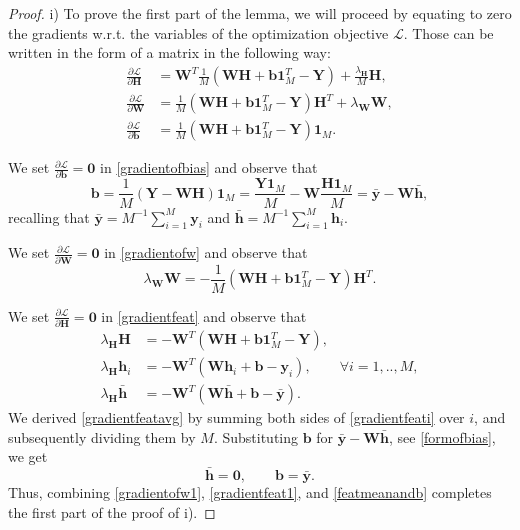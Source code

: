 \documentclass{article}
\theoremstyle{plain}
\theoremstyle{definition}
\theoremstyle{remark}
\newcommand{\bW}{{\mathbf W}}
\newcommand{\bY}{{\mathbf Y}}
\newcommand{\bH}{{\mathbf H}}
\newcommand{\bh}{{\mathbf h}}
\newcommand{\by}{{\mathbf y}}
\newcommand{\byb}{{\bar{\mathbf y}}}
\newcommand{\bb}{{\mathbf b}}
\newcommand{\lH}{\lambda_{\bH}}
\newcommand{\lW}{\lambda_{\bW}}
\begin{document}
\begin{proof}
i) 
To prove the first part of the lemma, we will proceed by equating to zero the gradients w.r.t. the variables of the optimization objective $\mathcal{L}$.
Those can be written in the form of a matrix in the following way:
\begin{align}
\frac{\partial \mathcal{L}}{\partial \bH}&=
\bW^{T} \frac{1}{M} (\bW \bH+\bb \mathbf{1}_M^{T}-\bY)+\frac{\lH}{M} \bH, \label{gradientfeat}
\\
\frac{\partial \mathcal{L}}{\partial \bW}&=
\frac{1}{M} (\bW \bH+\bb \mathbf{1}_M^{T}-\bY) \bH^{T}+\lW \bW, \label{gradientofw}
\\
\frac{\partial \mathcal{L}}{\partial \bb} &= \frac{1}{M}(\bW \bH + \bb \mathbf{1}_M^T -\bY) \mathbf{1}_M. 
\label{gradientofbias}
\end{align}

We set $\frac{\partial \mathcal{L}}{\partial \bb}=\mathbf{0}$ in \eqref{gradientofbias} and observe that 
\begin{equation} \label{formofbias}
\bb = \frac{1}{M} (\bY-\bW \bH) \mathbf{1}_M=
\frac{\bY \mathbf{1}_M}{M}-\bW \frac{\bH \mathbf{1}_M}{M}=\byb - \bW \bar{\bh}, 
\end{equation}
recalling that $\byb=M^{-1} \sum_{i=1}^M \by_i$ and $\bar{\bh}=M^{-1} \sum_{i=1}^M \bh_i$.

We set $\frac{\partial \mathcal{L}}{\partial \bW}=\mathbf{0}$ in \eqref{gradientofw} and observe that
\begin{equation} \label{gradientofw1}
    \lW \bW = -\frac{1}{M} (\bW\bH+\bb \mathbf{1}_M^T-\bY) \bH^{T}.
\end{equation}

We set $\frac{\partial \mathcal{L}}{\partial \bH}=\mathbf{0}$ in \eqref{gradientfeat} and observe that
\begin{align} \label{gradientfeat1}
\lH \bH &= - \bW^{T} (\bW \bH+\bb \mathbf{1}_M^{T}-\bY), 
\\
\lH \bh_i&=-\bW^{T} (\bW \bh_i+\bb-\by_i), \qquad \forall i=1,..,M, \label{gradientfeati}
\\
\lH \bar{\bh}&=-\bW^{T}(\bW \bar{\bh}+\bb-\byb). \label{gradientfeatavg}
\end{align}
We derived \eqref{gradientfeatavg} by summing both sides of \eqref{gradientfeati} over $i$, and subsequently dividing them by $M$. Substituting $\bb$ for $\byb-\bW \bar{\bh}$, see \eqref{formofbias}, we get
\begin{equation} \label{featmeanandb}
    \bar{\bh}=\mathbf{0}, \qquad \bb=\byb.
\end{equation}
Thus, combining \eqref{gradientofw1}, \eqref{gradientfeat1}, and \eqref{featmeanandb} completes the first part of the proof of i).


\end{proof}
\end{document}
